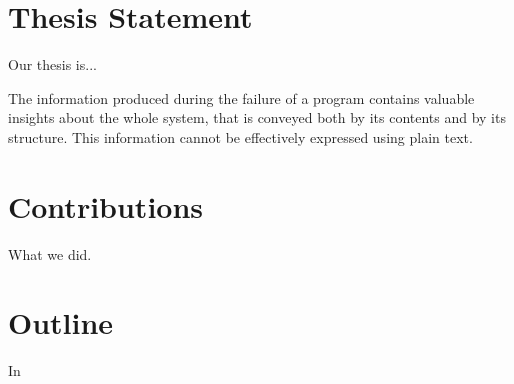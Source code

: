 



\section{Thesis Statement}\label{sec:thesis}

Our thesis is...

\begin{framed}
The information produced during the failure of a program contains valuable insights about the whole system, that is conveyed both by its contents and by its structure.
This information cannot be effectively expressed using plain text.
\end{framed}


\section{Contributions}

What we did.


\section{Outline}

In 
